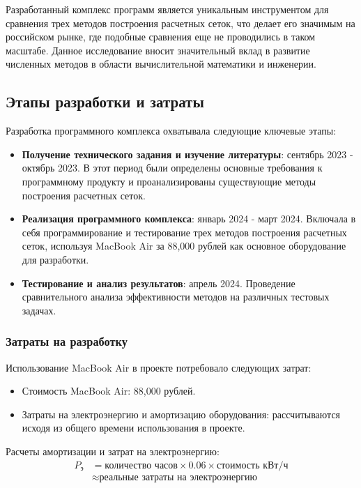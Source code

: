 \documentclass[a4paper,14pt,russian]{extreport}
\renewcommand{\_}{\kern-1.5pt\textunderscore\kern-1.5pt}
\begin{document}
Разработанный комплекс программ является уникальным инструментом для сравнения трех методов построения расчетных сеток, что делает его значимым на российском рынке, где подобные сравнения еще не проводились в таком масштабе. Данное исследование вносит значительный вклад в развитие численных методов в области вычислительной математики и инженерии.

\subsection{Этапы разработки и затраты}
Разработка программного комплекса охватывала следующие ключевые этапы:

\begin{itemize}
    \item \textbf{Получение технического задания и изучение литературы}: сентябрь 2023 - октябрь 2023. В этот период были определены основные требования к программному продукту и проанализированы существующие методы построения расчетных сеток.
    \item \textbf{Реализация программного комплекса}: январь 2024 - март 2024. Включала в себя программирование и тестирование трех методов построения расчетных сеток, используя MacBook Air за 88,000 рублей как основное оборудование для разработки.
    \item \textbf{Тестирование и анализ результатов}: апрель 2024. Проведение сравнительного анализа эффективности методов на различных тестовых задачах.
\end{itemize}

\subsubsection{Затраты на разработку}
Использование MacBook Air в проекте потребовало следующих затрат:
\begin{itemize}
    \item Стоимость MacBook Air: 88,000 рублей.
    \item Затраты на электроэнергию и амортизацию оборудования: рассчитываются исходя из общего времени использования в проекте.
\end{itemize}

Расчеты амортизации и затрат на электроэнергию:
\begin{align*}
    P_{\text{э}} &= \text{количество часов} \times 0.06 \times \text{стоимость кВт/ч} \\
    &\approx \text{реальные затраты на электроэнергию}
\end{align*}
\end{document}
